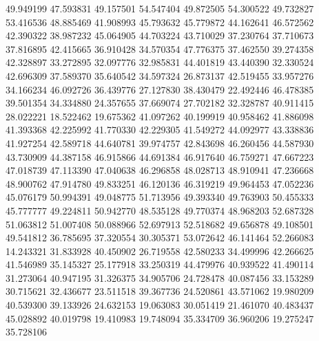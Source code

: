 49.949199
47.593831
49.157501
54.547404
49.872505
54.300522
49.732827
53.416536
48.885469
41.908993
45.793632
45.779872
44.162641
46.572562
42.390322
38.987232
45.064905
44.703224
43.710029
37.230764
37.710673
37.816895
42.415665
36.910428
34.570354
47.776375
37.462550
39.274358
42.328897
33.272895
32.097776
32.985831
44.401819
43.440390
32.330524
42.696309
37.589370
35.640542
34.597324
26.873137
42.519455
33.957276
34.166234
46.092726
36.439776
27.127830
38.430479
22.492446
46.478385
39.501354
34.334880
24.357655
37.669074
27.702182
32.328787
40.911415
28.022221
18.522462
19.675362
41.097262
40.199919
40.958462
41.886098
41.393368
42.225992
41.770330
42.229305
41.549272
44.092977
43.338836
41.927254
42.589718
44.640781
39.974757
42.843698
46.260456
44.587930
43.730909
44.387158
46.915866
44.691384
46.917640
46.759271
47.667223
47.018739
47.113390
47.040638
46.296858
48.028713
48.910941
47.236668
48.900762
47.914780
49.833251
46.120136
46.319219
49.964453
47.052236
45.076179
50.994391
49.048775
51.713956
49.393340
49.763903
50.455333
45.777777
49.224811
50.942770
48.535128
49.770374
48.968203
52.687328
51.063812
51.007408
50.088966
52.697913
52.518682
49.656878
49.108501
49.541812
36.785695
37.320554
30.305371
53.072642
46.141464
52.266083
14.243321
31.833928
40.450902
26.719558
42.580233
34.499996
42.266625
41.546989
35.145327
25.177918
33.250319
44.479976
40.939522
41.490114
31.273064
40.947195
31.326375
34.905706
24.728478
40.087456
33.153289
30.715621
32.436677
23.511518
39.367736
24.520861
43.571062
19.980209
40.539300
39.133926
24.632153
19.063083
30.051419
21.461070
40.483437
45.028892
40.019798
19.410983
19.748094
35.334709
36.960206
19.275247
35.728106

